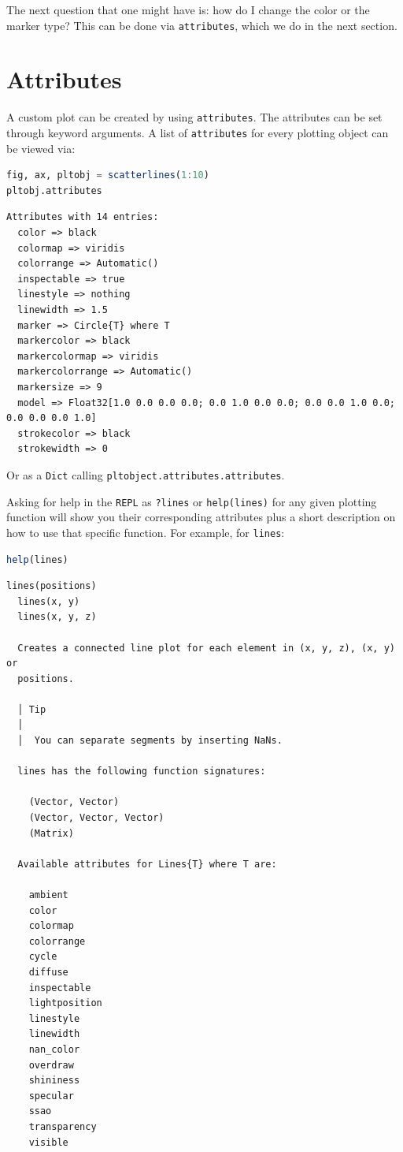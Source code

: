 \documentclass[
  notoc %
]{tufte-book}
\newcommand{\passthrough}[1]{#1}
\begin{document}
The next question that one might have is: how do I change the color or
the marker type? This can be done via
\passthrough{\lstinline!attributes!}, which we do in the next section.

\hypertarget{sec:datavisMakie_attributes}{%
\section{Attributes}\label{sec:datavisMakie_attributes}}

A custom plot can be created by using
\passthrough{\lstinline!attributes!}. The attributes can be set through
keyword arguments. A list of \passthrough{\lstinline!attributes!} for
every plotting object can be viewed via:

\begin{lstlisting}[language=Julia]
fig, ax, pltobj = scatterlines(1:10)
pltobj.attributes
\end{lstlisting}

\begin{lstlisting}[language=Output]
Attributes with 14 entries:
  color => black
  colormap => viridis
  colorrange => Automatic()
  inspectable => true
  linestyle => nothing
  linewidth => 1.5
  marker => Circle{T} where T
  markercolor => black
  markercolormap => viridis
  markercolorrange => Automatic()
  markersize => 9
  model => Float32[1.0 0.0 0.0 0.0; 0.0 1.0 0.0 0.0; 0.0 0.0 1.0 0.0; 0.0 0.0 0.0 1.0]
  strokecolor => black
  strokewidth => 0
\end{lstlisting}

Or as a \passthrough{\lstinline!Dict!} calling
\passthrough{\lstinline!pltobject.attributes.attributes!}.

Asking for help in the \passthrough{\lstinline!REPL!} as
\passthrough{\lstinline!?lines!} or
\passthrough{\lstinline!help(lines)!} for any given plotting function
will show you their corresponding attributes plus a short description on
how to use that specific function. For example, for
\passthrough{\lstinline!lines!}:

\begin{lstlisting}[language=Julia]
help(lines)
\end{lstlisting}

\begin{lstlisting}[language=Output]
  lines(positions)
  lines(x, y)
  lines(x, y, z)

  Creates a connected line plot for each element in (x, y, z), (x, y) or
  positions.

  │ Tip
  │
  │  You can separate segments by inserting NaNs.

  lines has the following function signatures:

    (Vector, Vector)
    (Vector, Vector, Vector)
    (Matrix)

  Available attributes for Lines{T} where T are:

    ambient
    color
    colormap
    colorrange
    cycle
    diffuse
    inspectable
    lightposition
    linestyle
    linewidth
    nan_color
    overdraw
    shininess
    specular
    ssao
    transparency
    visible
\end{lstlisting}
\end{document}
